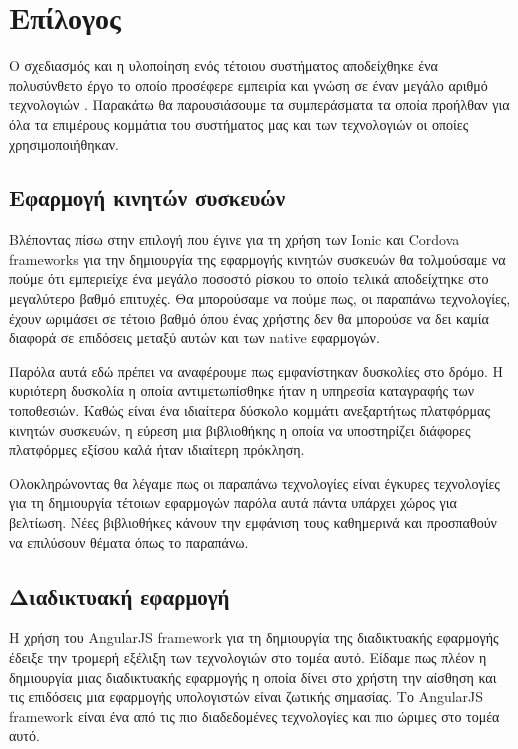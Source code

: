 \chapter{Επίλογος}
Ο σχεδιασμός και η υλοποίηση ενός τέτοιου συστήματος αποδείχθηκε ένα πολυσύνθετο έργο το οποίο προσέφερε εμπειρία και γνώση σε έναν μεγάλο αριθμό τεχνολογιών \citep{pragmatic}. Παρακάτω θα παρουσιάσουμε τα συμπεράσματα τα οποία προήλθαν για όλα τα επιμέρους κομμάτια του συστήματος μας και των τεχνολογιών οι οποίες χρησιμοποιήθηκαν.


\section{Εφαρμογή κινητών συσκευών}
Βλέποντας πίσω στην επιλογή που έγινε για τη χρήση των Ionic και Cordova frameworks για την δημιουργία της εφαρμογής κινητών συσκευών θα τολμούσαμε να πούμε ότι εμπεριείχε ένα μεγάλο ποσοστό ρίσκου το οποίο τελικά αποδείχτηκε στο μεγαλύτερο βαθμό επιτυχές. Θα μπορούσαμε να πούμε πως, οι παραπάνω τεχνολογίες, έχουν ωριμάσει σε τέτοιο βαθμό όπου ένας χρήστης δεν θα μπορούσε να δει καμία διαφορά σε επιδόσεις μεταξύ αυτών και των native εφαρμογών.

\par
Παρόλα αυτά εδώ πρέπει να αναφέρουμε πως εμφανίστηκαν δυσκολίες στο δρόμο. Η κυριότερη δυσκολία η οποία αντιμετωπίσθηκε ήταν η υπηρεσία καταγραφής των τοποθεσιών. Καθώς είναι ένα ιδιαίτερα δύσκολο κομμάτι ανεξαρτήτως πλατφόρμας κινητών συσκευών, η εύρεση μια βιβλιοθήκης η οποία να υποστηρίζει διάφορες πλατφόρμες εξίσου καλά ήταν ιδιαίτερη πρόκληση. 
\par
Ολοκληρώνοντας θα λέγαμε πως οι παραπάνω τεχνολογίες είναι έγκυρες τεχνολογίες για τη δημιουργία τέτοιων εφαρμογών παρόλα αυτά πάντα υπάρχει χώρος για βελτίωση. Νέες βιβλιοθήκες κάνουν την εμφάνιση τους καθημερινά και προσπαθούν να επιλύσουν θέματα όπως το παραπάνω.

\section{Διαδικτυακή εφαρμογή}
Η χρήση του AngularJS framework για τη δημιουργία της διαδικτυακής εφαρμογής έδειξε την τρομερή εξέλιξη των τεχνολογιών στο τομέα αυτό. Είδαμε πως πλέον η δημιουργία μιας διαδικτυακής εφαρμογής η οποία δίνει στο χρήστη την αίσθηση και τις επιδόσεις μια εφαρμογής υπολογιστών είναι ζωτικής σημασίας. Το AngularJS framework είναι ένα από τις πιο διαδεδομένες τεχνολογίες και πιο ώριμες στο τομέα αυτό. 

